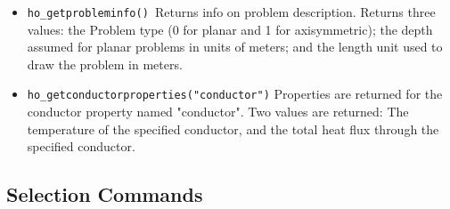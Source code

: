 \begin{itemize}
\item \texttt{ho\_getprobleminfo() }Returns info on problem description. Returns three
values: the Problem type (0 for planar and 1 for axisymmetric); the depth
assumed for planar problems in units of meters; and the length unit used to draw the
problem in meters.

\item \texttt{ho\_getconductorproperties("conductor")} Properties are returned for the
conductor property named "conductor". Two values are returned: The temperature
of the specified conductor, and the total heat flux through the specified
conductor.
\end{itemize}

\subsection{Selection Commands}

